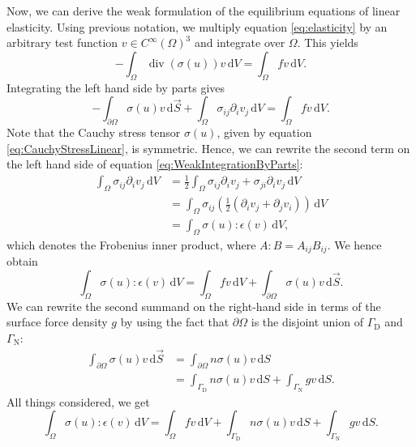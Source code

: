 \documentclass[a4paper, 11pt, twoside]{article}
\theoremstyle{plain}
\theoremstyle{definition}
\DeclareMathOperator\Div{div}
\newcommand{\dd}{\,\mathrm{d}}
\begin{document}
Now, we can derive the weak formulation of the equilibrium equations of linear elasticity.
Using previous notation, we multiply equation \eqref{eq:elasticity} by an arbitrary test function $v \in  C^\infty (\Omega)^3$ and integrate over $\Omega$.
This yields
\begin{equation}
 - \int_\Omega \Div(\sigma(u)) v \dd V = \int_\Omega f v \dd V .
 \label{eq:WeakFormulation}
\end{equation}
Integrating the left hand side by parts gives
\begin{equation}
 - \int_{\partial\Omega} \sigma(u) v \dd \vec{S} + \int_\Omega \sigma_{ij} \partial_i v_j \dd V = \int_\Omega f v \dd V .
 \label{eq:WeakIntegrationByParts}
\end{equation}
Note that the Cauchy stress tensor $\sigma(u)$, given by equation \eqref{eq:CauchyStressLinear}, is symmetric.
Hence, we can rewrite the second term on the left hand side of equation \eqref{eq:WeakIntegrationByParts}:
\begin{align}
 \int_\Omega \sigma_{ij} \partial_i v_j \dd V &= \frac{1}{2} \int_\Omega \sigma_{ij} \partial_i v_j + \sigma_{ji} \partial_i v_j \dd V \\
 &= \int_\Omega \sigma_{ij} \left( \frac{1}{2} \left( \partial_i v_j + \partial_j v_i \right) \right) \dd V \\
 &= \int_\Omega \sigma(u) : \epsilon(v) \dd V,
\end{align}
which denotes the Frobenius inner product, where $A:B = A_{ij} B_{ij}$.
We hence obtain
\begin{equation}
  \int_\Omega \sigma(u) : \epsilon(v) \dd V = \int_\Omega f v \dd V + \int_{\partial\Omega} \sigma(u) v \dd \vec{S}.
  \label{eq:WeakNearlyFinal}
\end{equation}
We can rewrite the second summand on the right-hand side in terms of the surface force density $g$ by using the fact that $\partial\Omega$ is the disjoint union of $\Gamma_\text{D}$ and $\Gamma_\text{N}$:
\begin{align}
 \int_{\partial\Omega} \sigma(u) v \dd \vec{S} &= \int_{\partial\Omega} n \sigma(u) v \dd S \\
 &= \int_{\Gamma_\text{D}} n \sigma(u) v \dd S + \int_{\Gamma_\text{N}} g v \dd S.
\end{align}
All things considered, we get
\begin{equation}
  \int_\Omega \sigma(u) : \epsilon(v) \dd V = \int_\Omega f v \dd V + \int_{\Gamma_\text{D}} n \sigma(u) v \dd S + \int_{\Gamma_\text{N}} g v \dd S.
  \label{eq:WeakFinal}
\end{equation}
\end{document}
